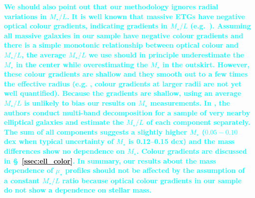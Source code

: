 \documentclass[fleqn,usenatbib]{mnras}
\def\mstar{{$M_{\star}$}}
\def\m2l{{$M_{\star}/L$}}
\def\mden{{$\mu_{\star}$}}
\newcommand{\song}[1]{\textcolor{cyan}{\textbf{#1}}}
\begin{document}
    \song{
    We should also point out that our methodology ignores radial variations in \m2l{}. 
    It is well known that massive ETGs have negative optical colour gradients, 
    indicating gradients in \m2l{} (e.g.\ \citealt{Carollo1993, Davies1993, 
    LaBarbera2012, dSouza2015}). 
    Assuming all massive galaxies in our sample have negative colour gradients and 
    there is a simple monotonic relationship between optical colour and \m2l{}, the
    average \m2l{} we use should in principle underestimate the \mstar{} in the 
    center while overestimating the \mstar{} in the outskirt.
    However, these colour gradients are shallow and they smooth out to a few times the 
    effective radius (e.g. \citealt{LaBarbera2010, Tal2011, DSouza2014}, 
    colour gradients at larger radii are not yet well quantified). 
    Because the gradients are shallow, using an average \m2l{} is unlikely to bias 
    our results on \mstar{} measurements.  
    In \citet{Huang2016}, the authors conduct multi-band decomposition for a sample 
    of very nearby elliptical galaxies and estimate the \m2l{} of each component 
    separately. 
    The sum of all components suggests a slightly higher \mstar{} ($0.05-0.10$ dex 
    when typical uncertainty of \mstar{} is 0.12--0.15 dex) and the mass differences 
    show no dependence on \mstar{}. 
    Colour gradients are discussed in \S~\ref{ssec:ell_color}. 
    In summary, our results about the mass dependence of \mden{} profiles should not 
    be affected by the assumption of a constant \m2l{} ratio because optical colour 
    gradients in our sample do not show a dependence on stellar mass.
    }

     
\clearpage

\clearpage

\bsp
\label{lastpage}
\end{document}
